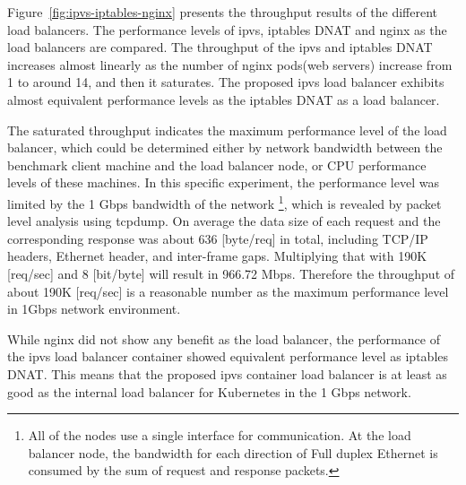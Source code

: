 
Figure~\ref{fig:ipvs-iptables-nginx} presents the throughput results of the different load balancers.
The performance levels of ipvs, iptables DNAT and nginx as the load balancers are compared.
The throughput of the ipvs and iptables DNAT increases almost linearly as the number of nginx pods(web servers) increase from 1 to around 14, and then it saturates.
The proposed ipvs load balancer exhibits almost equivalent performance levels as the iptables DNAT as a load balancer.

The saturated throughput indicates the maximum performance level of the load balancer, which could be determined either by network bandwidth between the benchmark client machine and the load balancer node, or CPU performance levels of these machines.
%
In this specific experiment, the performance level was limited by the 1 Gbps bandwidth of the network
\footnote{
All of the nodes use a single interface for communication. 
At the load balancer node, the bandwidth for each direction of Full duplex Ethernet is consumed by the sum of request and response packets.
}, 
which is revealed by packet level analysis using tcpdump\cite{takahashi2018portable}.
%
On average the data size of each request and the corresponding response was about 636 [byte/req] in total, including TCP/IP headers, Ethernet header, and inter-frame gaps.
Multiplying that with 190K [req/sec] and 8 [bit/byte] will result in 966.72 Mbps.
Therefore the throughput of about 190K [req/sec] is a reasonable number as the maximum performance level in 1Gbps network environment.

While nginx did not show any benefit as the load balancer, the performance of the ipvs load balancer container showed equivalent performance level as iptables DNAT.
This means that the proposed ipvs container load balancer is at least as good as the internal load balancer for Kubernetes in the 1 Gbps network.

